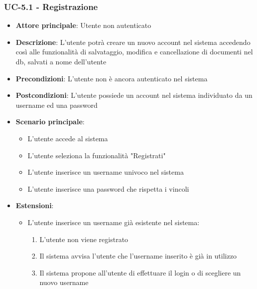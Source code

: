 \documentclass[11pt,a4paper]{article}
\begin{document}
\subsubsection{UC-5.1 - Registrazione}
\begin{itemize}
    \item \textbf{Attore principale}: Utente non autenticato
    \item \textbf{Descrizione}: L'utente potrà creare un nuovo account nel sistema accedendo così alle funzionalità di salvataggio, modifica e cancellazione di documenti nel db, salvati a nome dell'utente
    \item \textbf{Precondizioni}: L'utente non è ancora autenticato nel sistema
    \item \textbf{Postcondizioni}: L'utente possiede un account nel sistema individuato da un username ed una password
    \item \textbf{Scenario principale}:
        \begin{itemize}
            \item L'utente accede al sistema
            \item L'utente seleziona la funzionalità "Registrati"
            \item L'utente inserisce un username univoco nel sistema
            \item L'utente inserisce una password che rispetta i vincoli
        \end{itemize}
    \item \textbf{Estensioni}:
        \begin{itemize}
            \item L'utente inserisce un username già esistente nel sistema:
                \begin{enumerate}
                    \item L'utente non viene registrato
                    \item Il sistema avvisa l'utente che l'username inserito è già in utilizzo
                    \item Il sistema propone all'utente di effettuare il login o di scegliere un nuovo username
                \end{enumerate}
        \end{itemize}
\end{itemize}
\end{document}
